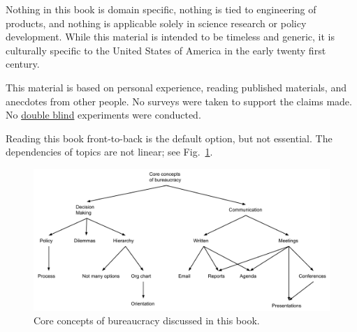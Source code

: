 


Nothing in this book is domain specific, nothing is tied to engineering of products, and nothing is applicable solely in science research or policy development. While this material is intended to be timeless and generic, it is culturally specific to the United States of America in the early twenty first century. %

This material is based on personal experience, reading published materials, and anecdotes from other people. No surveys were taken to support the claims made. No \href{https://en.wikipedia.org/wiki/Blinded_experiment}{double blind} experiments were conducted. 

Reading this book front-to-back is the default option, but not essential. The dependencies of topics are not linear; see Fig.~\ref{fig:core-concepts}.

\begin{figure}[ht]
    \centering
    \includegraphics[width=1\textwidth]{images/core_concepts_map.pdf}
    \caption{Core concepts of bureaucracy discussed in this book. }
    \label{fig:core-concepts}
\end{figure}

